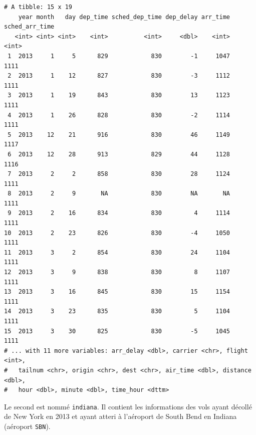 \documentclass[a4paperpaper,]{article}
\newenvironment{Shaded}{\begin{snugshade}}{\end{snugshade}}
\newcommand{\KeywordTok}[1]{\textcolor[rgb]{0.12,0.11,0.11}{\textbf{#1}}}
\newcommand{\NormalTok}[1]{\textcolor[rgb]{0.12,0.11,0.11}{#1}}
\newcommand{\OperatorTok}[1]{\textcolor[rgb]{0.12,0.11,0.11}{#1}}
\newcommand{\StringTok}[1]{\textcolor[rgb]{0.75,0.01,0.01}{#1}}
\theoremstyle{definition}
\theoremstyle{definition}
\theoremstyle{definition}
\theoremstyle{remark}
\begin{document}
\begin{verbatim}
# A tibble: 15 x 19
    year month   day dep_time sched_dep_time dep_delay arr_time sched_arr_time
   <int> <int> <int>    <int>          <int>     <dbl>    <int>          <int>
 1  2013     1     5      829            830        -1     1047           1111
 2  2013     1    12      827            830        -3     1112           1111
 3  2013     1    19      843            830        13     1123           1111
 4  2013     1    26      828            830        -2     1114           1111
 5  2013    12    21      916            830        46     1149           1117
 6  2013    12    28      913            829        44     1128           1116
 7  2013     2     2      858            830        28     1124           1111
 8  2013     2     9       NA            830        NA       NA           1111
 9  2013     2    16      834            830         4     1114           1111
10  2013     2    23      826            830        -4     1050           1111
11  2013     3     2      854            830        24     1104           1111
12  2013     3     9      838            830         8     1107           1111
13  2013     3    16      845            830        15     1154           1111
14  2013     3    23      835            830         5     1104           1111
15  2013     3    30      825            830        -5     1045           1111
# ... with 11 more variables: arr_delay <dbl>, carrier <chr>, flight <int>,
#   tailnum <chr>, origin <chr>, dest <chr>, air_time <dbl>, distance <dbl>,
#   hour <dbl>, minute <dbl>, time_hour <dttm>
\end{verbatim}

Le second est nommé \texttt{indiana}. Il contient les informations des
vols ayant décollé de New York en 2013 et ayant atteri à l'aéroport de
South Bend en Indiana (aéroport \texttt{SBN}).

\begin{Shaded}
\end{Shaded}
\end{document}
